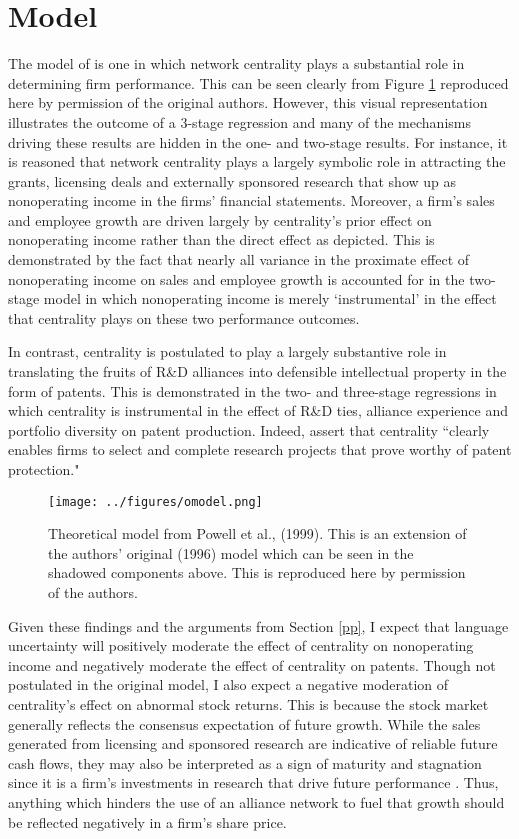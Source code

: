 \section{Model}
The model of \citet{powell1999} is one in which network centrality plays a substantial role in determining firm performance. This can be seen clearly from Figure \ref{omodel} reproduced here by permission of the original authors. However, this visual representation illustrates the outcome of a 3-stage regression and many of the mechanisms driving these results are hidden in the one- and two-stage results.  For instance, it is reasoned that network centrality plays a largely symbolic role in attracting the grants, licensing deals and externally sponsored research that show up as nonoperating income in the firms' financial statements. Moreover, a firm's sales and employee growth are driven largely by centrality's prior effect on nonoperating income rather than the direct effect as depicted. This is demonstrated by the fact that nearly all variance in the proximate effect of nonoperating income on sales and employee growth is accounted for in the two-stage model in which nonoperating income is merely `instrumental' in the effect that centrality plays on these two performance outcomes.

In contrast, centrality is postulated to play a largely substantive role in translating the fruits of R\&D alliances into defensible intellectual property in the form of patents. This is demonstrated in the two- and three-stage regressions in which centrality is instrumental in the effect of R\&D ties, alliance experience and portfolio diversity on patent production. Indeed, \citet[p. 20]{powell1999} assert that centrality ``clearly enables firms to select and complete research projects that prove worthy of patent protection."

\begin{figure}
\begin{center}
\texttt{[image: ../figures/omodel.png]}
\caption[Powell et al., (1999) Model]{Theoretical model from Powell et al., (1999). This is an extension of the authors' original (1996) model which can be seen in the shadowed components above. This is reproduced here by permission of the authors.\label{omodel}}
\end{center}
\end{figure}

Given these findings and the arguments from Section \ref{pp}, I expect that language uncertainty will positively moderate the effect of centrality on nonoperating income and negatively moderate the effect of centrality on patents. Though not postulated in the original model, I also expect a negative moderation of centrality's effect on abnormal stock returns. This is because the stock market generally reflects the consensus expectation of future growth. While the sales generated from licensing and sponsored research are indicative of reliable future cash flows, they may also be interpreted as a sign of maturity and stagnation since it is a firm's investments in research that drive future performance \citep{wolff2001}. Thus, anything which hinders the use of an alliance network to fuel that growth should be reflected negatively in a firm's share price. 

